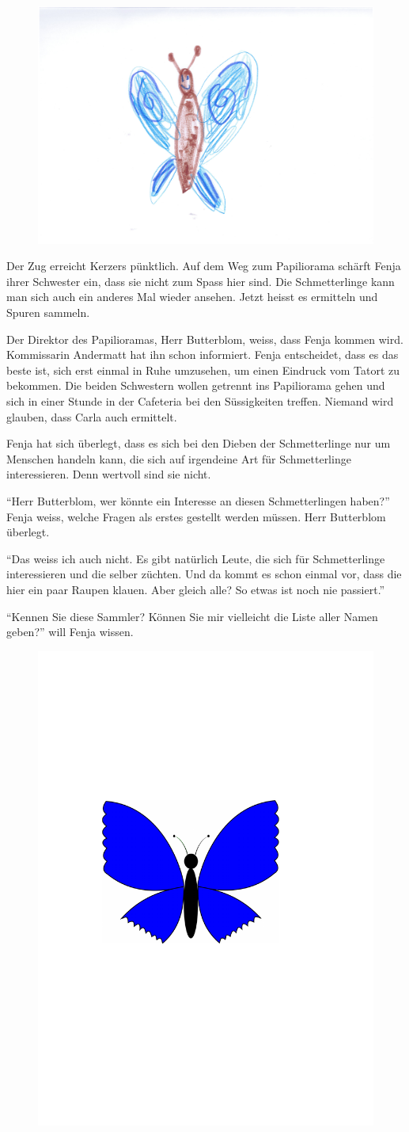 \begin{figure}[h]
\centering
\includegraphics[width=.6\textwidth]{bilder/schmetterlingg.pdf}
\end{figure}
Der Zug erreicht Kerzers pünktlich. Auf dem Weg zum Papiliorama schärft Fenja ihrer Schwester ein, dass sie nicht zum Spass hier sind. Die Schmetterlinge kann man sich auch ein anderes Mal wieder ansehen. Jetzt heisst es ermitteln und Spuren sammeln.

Der Direktor des Papilioramas, Herr Butterblom, weiss, dass Fenja kommen wird. Kommissarin Andermatt hat ihn schon informiert. Fenja entscheidet, dass es das beste ist, sich erst einmal in Ruhe umzusehen, um einen Eindruck vom Tatort zu bekommen. Die beiden Schwestern wollen getrennt ins Papiliorama gehen und sich in einer Stunde in der Cafeteria bei den Süssigkeiten treffen. Niemand wird glauben, dass Carla auch ermittelt.

Fenja hat sich überlegt, dass es sich bei den Dieben der Schmetterlinge nur um Menschen handeln kann, die sich auf irgendeine Art für Schmetterlinge interessieren. Denn wertvoll sind sie nicht.  

\enquote{Herr Butterblom, wer könnte ein Interesse an diesen Schmetterlingen haben?} Fenja weiss, welche Fragen als erstes gestellt werden müssen. Herr Butterblom überlegt.

\enquote{Das weiss ich auch nicht. Es gibt natürlich Leute, die sich für Schmetterlinge interessieren und die selber züchten. Und da kommt es schon einmal vor, dass die hier ein paar Raupen klauen. Aber gleich alle? So etwas ist noch nie passiert.} 

\enquote{Kennen Sie diese Sammler? Können Sie mir vielleicht die Liste aller Namen geben?} will Fenja wissen.

\begin{figure}[H]
\centering
\includegraphics[width=.05\textwidth]{bilder/inkling.pdf}
\end{figure}

